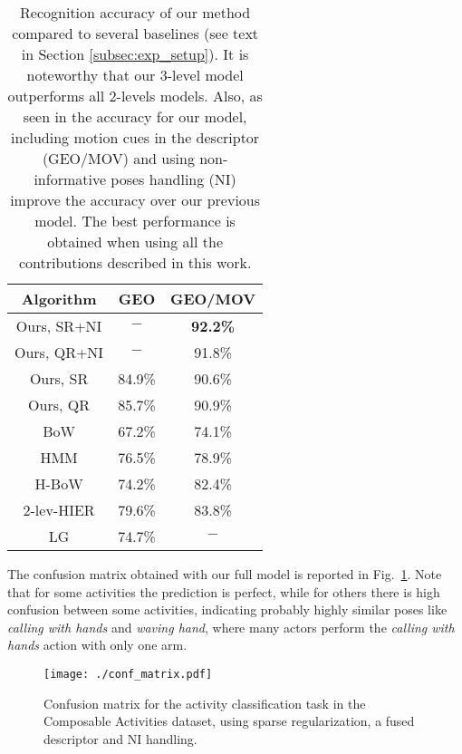 \begin{table}
\centering
{\small
\begin{tabular}{|c|c|c|}
\hline
\textbf{Algorithm} & \textbf{GEO} &  \textbf{GEO/MOV}  \\
\hline
Ours, SR+NI& $-$  &  \textbf{92.2\%} \\
Ours, QR+NI& $-$  & 91.8\%  \\
Ours, SR& 84.9\%  & 90.6\%  \\
Ours, QR& 85.7\%  & 90.9\%   \\
\hline
BoW& 67.2\% & 74.1\%    \\
HMM& 76.5\% & 78.9\%  \\
H-BoW& 74.2\% & 82.4\%   \\
2-lev-HIER& 79.6\% & 83.8\%  \\
\hline
LG \cite{vemulapalli2014human} & 74.7\% & $-$  \\
\hline
\end{tabular}
}
\normalsize
\caption{Recognition accuracy of our method compared to several baselines (see text in Section
\ref{subsec:exp_setup}). It is noteworthy that our 3-level model outperforms all 2-levels models. 
Also, as seen in the accuracy for our model, including motion cues in the descriptor (GEO/MOV) and 
using non-informative poses handling (NI) improve the accuracy over our previous model. The best 
performance is obtained when using all the contributions described in this work.
}
\label{Table-UniNorte}
\end{table}

The confusion matrix obtained with our full model is reported in
Fig.~\ref{fig:confusion_activities}. Note that for some activities the
prediction is perfect, while for others there is high confusion between
some activities, indicating probably highly similar poses like
\emph{calling with hands} and \emph{waving hand}, where many actors
perform the \emph{calling with hands} action with only one arm.

\begin{figure}[tb]
\begin{center}
\texttt{[image: ./conf\_matrix.pdf]}
\end{center}
   \caption{Confusion matrix for the activity classification task in the Composable Activities 
dataset, using sparse regularization, a fused descriptor and NI handling.}
\label{fig:confusion_activities}
\end{figure}

